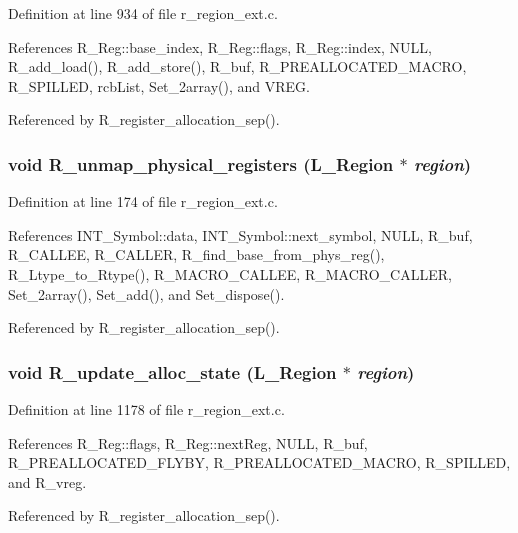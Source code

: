 Definition at line 934 of file r\_\-region\_\-ext.c.

References R\_\-Reg::base\_\-index, R\_\-Reg::flags, R\_\-Reg::index, NULL, R\_\-add\_\-load(), R\_\-add\_\-store(), R\_\-buf, R\_\-PREALLOCATED\_\-MACRO, R\_\-SPILLED, rcb\-List, Set\_\-2array(), and VREG.

Referenced by R\_\-register\_\-allocation\_\-sep().
\subsubsection{\setlength{\rightskip}{0pt plus 5cm}void R\_\-unmap\_\-physical\_\-registers (L\_\-Region $\ast$ {\em region})}\label{r__region__ext_8c_f2ff9af6d93487431a3e31b787ac33ac}




Definition at line 174 of file r\_\-region\_\-ext.c.

References INT\_\-Symbol::data, INT\_\-Symbol::next\_\-symbol, NULL, R\_\-buf, R\_\-CALLEE, R\_\-CALLER, R\_\-find\_\-base\_\-from\_\-phys\_\-reg(), R\_\-Ltype\_\-to\_\-Rtype(), R\_\-MACRO\_\-CALLEE, R\_\-MACRO\_\-CALLER, Set\_\-2array(), Set\_\-add(), and Set\_\-dispose().

Referenced by R\_\-register\_\-allocation\_\-sep().
\subsubsection{\setlength{\rightskip}{0pt plus 5cm}void R\_\-update\_\-alloc\_\-state (L\_\-Region $\ast$ {\em region})}\label{r__region__ext_8c_6a0ee77089a5232a8042520d0c5955f5}




Definition at line 1178 of file r\_\-region\_\-ext.c.

References R\_\-Reg::flags, R\_\-Reg::next\-Reg, NULL, R\_\-buf, R\_\-PREALLOCATED\_\-FLYBY, R\_\-PREALLOCATED\_\-MACRO, R\_\-SPILLED, and R\_\-vreg.

Referenced by R\_\-register\_\-allocation\_\-sep().
